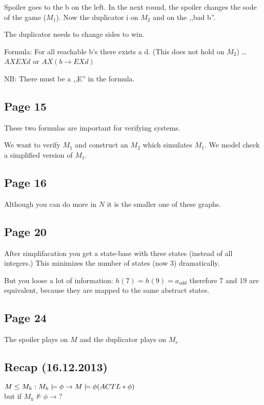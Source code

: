 \documentclass[a4paper]{article}
\newcommand{\entails}[1]{\models{#1}}
\begin{document}
Spoiler goes to the b on the left. In the next round, the spoiler changes the
sode of the game ($M_1$). Now the duplicator i on $M_2$ and on the ,,bad b''.

The duplicator needs to change sides to win.

Formula: For all reachable b's there exists a d. (This does not hold on
$M_2$) \ldots $AXEXd$ or $AX(b \rightarrow EXd)$

NB: There must be a ,,E'' in the formula.

\subsection{Page 15}
These two formulas are important for verifying systems.

We want to verify $M_1$ and construct an $M_2$ which simulates $M_1$. We model
check a simplified version of $M_1$.

\subsection{Page 16}
Although you can do more in $N$ it is the smaller one of these graphs.


\subsection{Page 20}
After simplifacation you get a state-base with three states (instead of all
integers.) This minimizes the number of states (now 3) dramatically.

But you loose a lot of information: $h(7) = h(9) = a_{odd}$ therefore 7 and 19
are equivalent, because they are mapped to the same abstract states.

\subsection{Page 24}
The spoiler plays on $M$ and the duplicator plays on $M_r$

\subsection{Recap (16.12.2013)}

$M \leq M_h :\\ M_h \entails{} \phi \rightarrow \\ M \entails{} \phi (ACTL*
\phi)$\\ but if $M_h \not \entails{} \phi \rightarrow ?$ 
\end{document}

